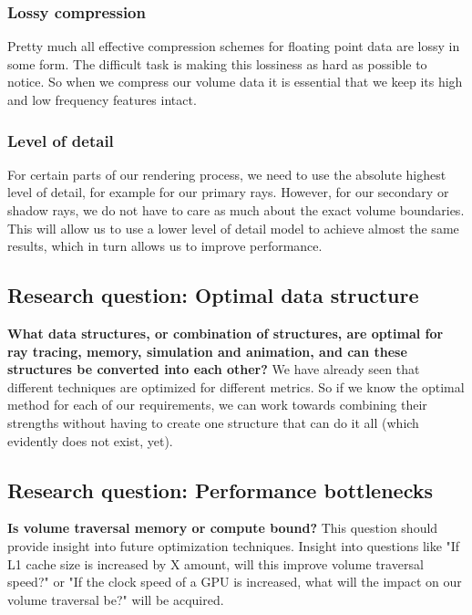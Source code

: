 \subsubsection{Lossy compression} \label{requirements:lossy_compression}
Pretty much all effective compression schemes for floating point data are lossy in some form. The difficult task is making this lossiness as hard as possible to notice. So when we compress our volume data it is essential that we keep its high and low frequency features intact.
\subsubsection{Level of detail} \label{requirements:level_of_detail}
For certain parts of our rendering process, we need to use the absolute highest level of detail, for example for our primary rays. However, for our secondary or shadow rays, we do not have to care as much about the exact volume boundaries. This will allow us to use a lower level of detail model to achieve almost the same results, which in turn allows us to improve performance.




\subsection{Research question: Optimal data structure}\label{research_questions:optimal_data_structure}
\noindent\textbf{What data structures, or combination of structures, are optimal for ray tracing, memory, simulation and animation, and can these structures be converted into each other?} We have already seen that different techniques are optimized for different metrics. So if we know the optimal method for each of our requirements, we can work towards combining their strengths without having to create one structure that can do it all (which evidently does not exist, yet).

\subsection{Research question: Performance bottlenecks}\label{research_questions:performance_bottlenecks}
\noindent\textbf{Is volume traversal memory or compute bound?} This question should provide insight into future optimization techniques. Insight into questions like "If L1 cache size is increased by X amount, will this improve volume traversal speed?" or "If the clock speed of a GPU is increased, what will the impact on our volume traversal be?" will be acquired.